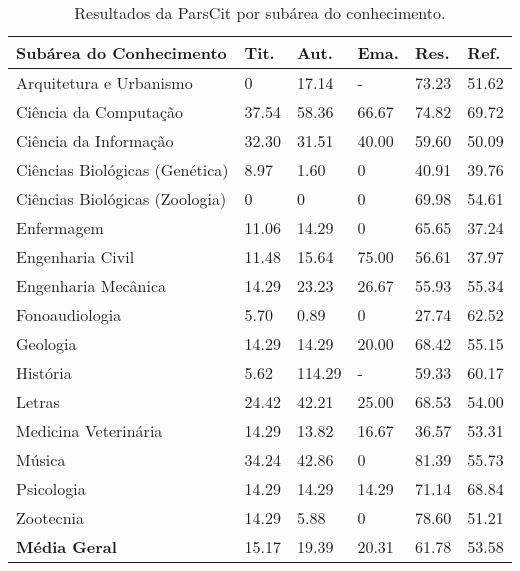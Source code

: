 \begin{table}
    \caption{Resultados da ParsCit por subárea do conhecimento.}
    \begin{center}
        \begin{tabular}{|p{6cm}|C{1.2cm}|C{1.2cm}|C{1.2cm}|C{1.2cm}|C{1.2cm}|}
            \hline 
            \textbf{Subárea do Conhecimento} & \textbf{Tit.} & \textbf{Aut.} & \textbf{Ema.} & \textbf{Res.} & \textbf{Ref.} \\ \hline 
            Arquitetura e Urbanismo & 0 & 17.14 & - & 73.23 & 51.62 \\ \hline
            Ciência da Computação & 37.54 & 58.36 & 66.67 & 74.82 & 69.72 \\ \hline
            Ciência da Informação & 32.30 & 31.51 & 40.00 & 59.60 & 50.09 \\ \hline
            Ciências Biológicas (Genética) & 8.97 & 1.60 & 0 & 40.91 & 39.76 \\ \hline
            Ciências Biológicas (Zoologia) & 0 & 0 & 0 & 69.98 & 54.61 \\ \hline
            Enfermagem & 11.06 & 14.29 & 0 & 65.65 & 37.24 \\ \hline
            Engenharia Civil & 11.48 & 15.64 & 75.00 & 56.61 & 37.97 \\ \hline
            Engenharia Mecânica & 14.29 & 23.23 & 26.67 & 55.93 & 55.34 \\ \hline
            Fonoaudiologia & 5.70 & 0.89 & 0 & 27.74 & 62.52 \\ \hline
            Geologia & 14.29 & 14.29 & 20.00 & 68.42 & 55.15 \\ \hline
            História & 5.62 & 114.29 & - & 59.33 & 60.17 \\ \hline
            Letras & 24.42 & 42.21 & 25.00 & 68.53 & 54.00 \\ \hline
            Medicina Veterinária & 14.29 & 13.82 & 16.67 & 36.57 & 53.31 \\ \hline
            Música & 34.24 & 42.86 & 0 & 81.39 & 55.73 \\ \hline
            Psicologia & 14.29 & 14.29 & 14.29 & 71.14 & 68.84 \\ \hline
            Zootecnia & 14.29 & 5.88 & 0 & 78.60 & 51.21 \\ \hline
            \textbf{Média Geral} & 15.17 & 19.39 & 20.31 & 61.78 & 53.58 \\ \hline
        \end{tabular}
    \end{center}
    \label{tab:results-parscit}
\end{table}

